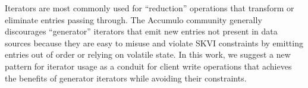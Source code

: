 

Iterators are most commonly used for ``reduction'' operations that transform
or eliminate entries passing through.  The Accumulo community generally discourages ``generator'' iterators 
that emit new entries not present in data sources %
because they are easy to misuse and violate SKVI constraints by emitting entries out of order or 
relying on volatile state.
In this work, we suggest a new pattern for iterator usage as a conduit for client write operations 
that achieves the benefits of generator iterators while avoiding their constraints.

